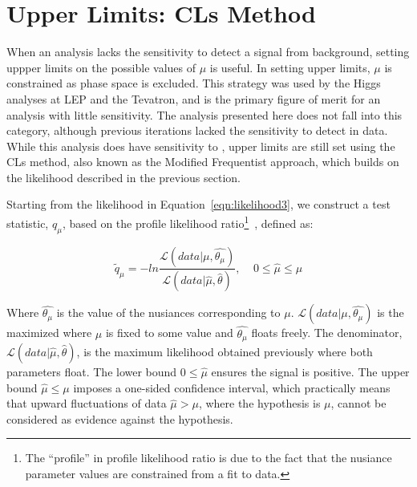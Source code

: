 \section{Upper Limits: CLs Method}
\label{sec:limit}
When an analysis lacks the sensitivity to detect a signal from background, setting uppper limits on the possible values of $\mu$ is useful. In setting upper
limits, $\mu$ is constrained as phase space is excluded. This strategy was used by the Higgs analyses at LEP and the Tevatron, and is the primary figure of merit
for an analysis with little sensitivity. The \tth analysis presented here does not fall into this category, although previous iterations lacked the sensitivity
to detect \tth in data. While this analysis does have sensitivity to \tth, upper limits are still set using the CLs method, also known as the
Modified Frequentist approach, which builds on the likelihood described in the previous section. 

Starting from the likelihood in Equation~\ref{eqn:likelihood3}, we construct a test statistic, $q_{\mu}$, based on the profile likelihood ratio\footnote{The ``profile'' in profile
likelihood ratio is due to the fact that the nusiance parameter values are constrained from a fit to data.}~\cite{AsymptoticLimits},
defined as:

\begin{equation}
\label{eqn:test_stat}
\tilde{q}_{\mu} = -ln \frac{\mathcal{L}(data|\mu,\hat{\theta_{\mu}})}{\mathcal{L}(data|\hat{\mu},\hat{\theta})},~~~~~0 \leq \hat{\mu} \leq{\mu}
\end{equation}

\noindent Where $\hat{\theta_{\mu}}$ is the value of the nusiances corresponding to $\mu$. $\mathcal{L}(data|\mu,\hat{\theta_{\mu}})$ is the maximized where $\mu$
is fixed to some value and $\hat{\theta_{\mu}}$ floats freely. The denominator, $\mathcal{L}(data|\hat{\mu},\hat{\theta})$, is the maximum likelihood obtained
previously where both parameters float. The lower bound $0 \leq \hat{\mu}$ ensures the signal is positive. The upper bound $\hat{\mu} \leq \mu$ imposes a one-sided
confidence interval, which practically means that upward fluctuations of data $\hat{\mu} > \mu$, where the hypothesis is $\mu$, cannot be considered as evidence
against the hypothesis.  

